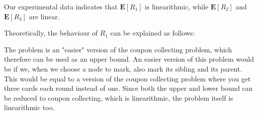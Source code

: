 \documentclass{tufte-handout}
\begin{document}
Our experimental data indicates that $\mathbf E [R_1]$ is linearithmic,
while $\mathbf E[R_2]$ and $\mathbf E[R_3]$ are linear.

Theoretically, the behaviour of $R_1$ can be explained as follows: 

The problem is an "easier" version of the coupon collecting problem, which therefore can be used as an upper bound. 
An easier version of this problem would be if we, when we choose a node to mark, also mark its sibling and its  parent. This would be equal to a version of the coupon collecting problem where you get three cards each round instead of one. 
Since both the upper and lower bound can be reduced to coupon collecting, which is linearithmic, the problem itself is linearithmic too.
\end{document}
